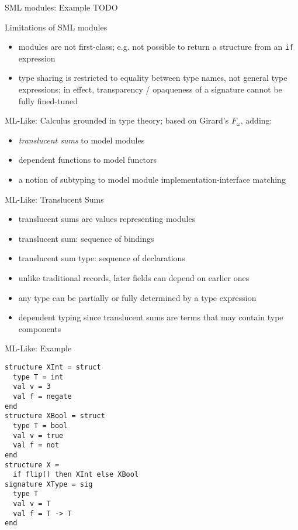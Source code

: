 \documentclass{beamer}
\begin{document}
\begin{frame}[fragile]{SML modules: Example}
TODO
\end{frame}

\begin{frame}{Limitations of SML modules}
\begin{itemize}
\item modules are not first-class; e.g. not possible to return a
  structure from an {\tt if} expression
\item type sharing is restricted to equality between type names, not
  general type expressions; in effect, transparency / opaqueness of a
  signature cannot be fully fined-tuned
\end{itemize}
\end{frame}

\begin{frame}{ML-Like: Calculus}
grounded in type theory; based on Girard's $F_\omega$, adding:
\begin{itemize}
\item {\it translucent sums} to model modules
\item dependent functions to model functors
\item a notion of subtyping to model module implementation-interface matching
\end{itemize}
\end{frame}

\begin{frame}{ML-Like: Translucent Sums}
\begin{itemize}
\item translucent sums are values representing modules
\item translucent sum: sequence of bindings
\item translucent sum type: sequence of declarations
\item unlike traditional records, later fields can depend on earlier ones
\item any type can be partially or fully determined by a type expression
\item dependent typing since translucent sums are terms that may contain type components
\end{itemize}
\end{frame}

\begin{frame}[fragile]{ML-Like: Example}
\begin{verbatim}
structure XInt = struct
  type T = int
  val v = 3
  val f = negate
end
structure XBool = struct
  type T = bool
  val v = true
  val f = not
end
structure X =
  if flip() then XInt else XBool
signature XType = sig
  type T
  val v = T
  val f = T -> T
end
\end{verbatim}
\end{frame}
\end{document}

